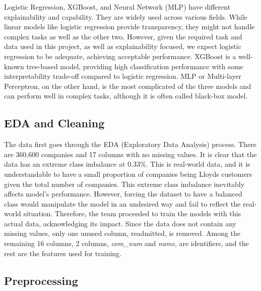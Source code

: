 \documentclass[ %
                    author={Natchalin Iwsakul \\ Inkaphol Siriwongwattana \\ Tanaphan Kummaraphat \\ Patorn Srisupap},
                supervisor={Fernando Moreno-Pino},
                    degree={MSc},
                     title={Propensity Modelling for SME Commercial Lending Using Open Public Data},
                  subtitle={Companies House filings and GDELT media coverage as predictors of first-time borrowing},
                      type={},
                      year={2026}]{dissertation}
\begin{document}
  Logistic Regression, XGBoost, and Neural Network (MLP) have different explainability and capability. They are widely used across various fields. While linear models like logistic regression provide transparency, they might not handle complex tasks as well as the other two. However, given the required task and data used in this project, as well as explainability focused, we expect logistic regression to be adequate, achieving acceptable performance. XGBoost is a well-known tree-based model, providing high classification performance with some interpretability trade-off compared to logistic regression. MLP or Multi-layer Perceptron, on the other hand, is the most complicated of the three models and can perform well in complex tasks, although it is often called black-box model.

  \subsection{EDA and Cleaning}
  The data first goes through the EDA (Exploratory Data Analysis) process. There are 360,600 companies and 17 columns with no missing values. It is clear that the data has an extreme class imbalance at 0.33\%. This is real-world data, and it is understandable to have a small proportion of companies being Lloyds customers given the total number of companies. This extreme class imbalance inevitably affects model's performance. However, forcing the dataset to have a balanced class would manipulate the model in an undesired way and fail to reflect the real-world situation. Therefore, the team proceeded to train the models with this actual data, acknowledging its impact. Since the data does not contain any missing values, only one unused column, readmitted, is removed. Among the remaining 16 columns, 2 columns, \textit{com\_num} and \textit{name}, are identifiers, and the rest are the features used for training.

  \subsection{Preprocessing}
  
\end{document}
